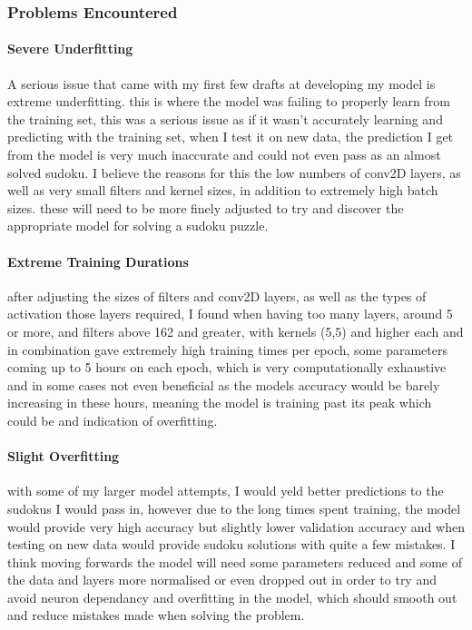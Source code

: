 \documentclass[]{final_report}
\begin{document}
\subsubsection{Problems Encountered}

\paragraph{Severe Underfitting}
A serious issue that came with my first few drafts at developing my model is extreme underfitting. this is where the model was failing to properly learn from the training set, this was a serious issue as if it wasn't accurately learning and predicting with the training set, when I test it on new data, the prediction I get from the model is very much inaccurate and could not even pass as an almost solved sudoku. I believe the reasons for this the low numbers of conv2D layers, as well as very small filters and kernel sizes, in addition to extremely high batch sizes. these will need to be more finely adjusted to try and discover the appropriate model for solving a sudoku puzzle.

\paragraph{Extreme Training Durations}
after adjusting the sizes of filters and conv2D layers, as well as the types of activation those layers required, I found when having too many layers, around 5 or more, and filters above 162 and greater, with kernels (5,5) and higher each and in combination gave extremely high training times per epoch, some parameters coming up to 5 hours on each epoch, which is very computationally exhaustive and in some cases not even beneficial as the models accuracy would be barely increasing in these hours, meaning the model is training past its peak which could be and indication of overfitting. 

\paragraph{Slight Overfitting}
with some of my larger model attempts, I would yeld better predictions to the sudokus I would pass in, however due to the long times spent training, the model would provide very high accuracy but slightly lower validation accuracy and when testing on new data would provide sudoku solutions with quite a few mistakes. I think moving forwards the model will need some parameters reduced and some of the data and layers more normalised or even dropped out in order to try and avoid neuron dependancy and overfitting in the model, which should smooth out and reduce mistakes made when solving the problem.
\end{document}
